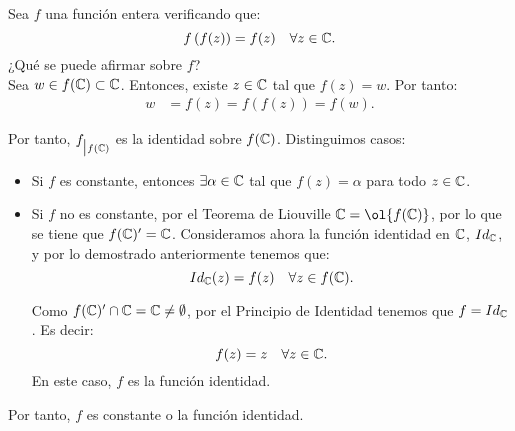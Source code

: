 \begin{ejercicio}
    Sea $f$ una función entera verificando que:
    \begin{equation*}
        f\left(f(z)\right)=f(z) \quad \forall z\in \mathbb{C}.
    \end{equation*}
    ¿Qué se puede afirmar sobre $f$?\\

    Sea $w\in f(\mathbb{C})\subset \mathbb{C}$. Entonces, existe $z\in \mathbb{C}$ tal que $f(z)=w$. Por tanto:
    \begin{align*}
        w &= f(z) = f\left(f(z)\right) = f(w).
    \end{align*}

    Por tanto, $f_{\big| f(\mathbb{C})}$ es la identidad sobre $f(\mathbb{C})$.
    Distinguimos casos:
    \begin{itemize}
        \item Si $f$ es constante, entonces $\exists \alpha\in \mathbb{C}$ tal que $f(z)=\alpha$ para todo $z\in \mathbb{C}$.
        \item Si $f$ no es constante, por el Teorema de Liouville $\bb{C}=\ol{f(\bb{C})}$, por lo que se tiene que $f(\mathbb{C})'=\mathbb{C}$. Consideramos ahora la función identidad en $\mathbb{C}$, $Id_{\mathbb{C}}$, y por lo demostrado anteriormente tenemos que:
        \begin{equation*}
            Id_{\mathbb{C}}(z) = f(z) \quad \forall z\in f(\mathbb{C}).
        \end{equation*}

        Como $f(\mathbb{C})'\cap \mathbb{C}=\mathbb{C}\neq \emptyset$, por el Principio de Identidad tenemos que $f=Id_{\mathbb{C}}$. Es decir:
        \begin{equation*}
            f(z)=z \quad \forall z\in \mathbb{C}.
        \end{equation*}
        En este caso, $f$ es la función identidad.
    \end{itemize}
    Por tanto, $f$ es constante o la función identidad.
\end{ejercicio}

